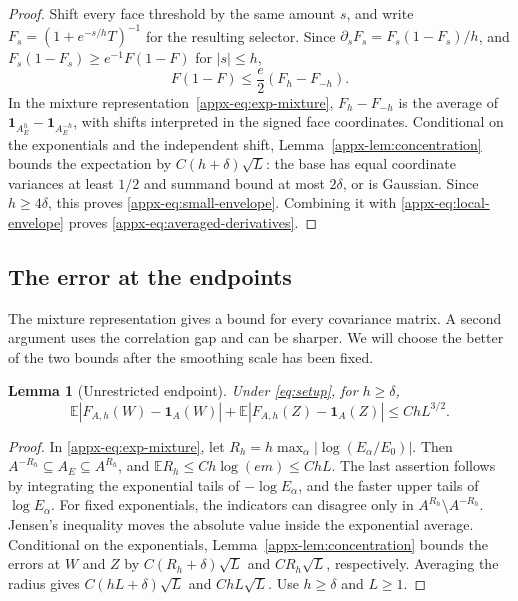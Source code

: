 \documentclass[11pt,letterpaper]{article}
\newtheorem{lemma}{Lemma}
\theoremstyle{remark}
\newcommand{\E}{\mathbb E}
\newcommand{\ind}{\mathbf 1}
\begin{document}
\begin{proof}
Shift every face threshold by the same amount \(s\), and write
\(F_s=(1+e^{-s/h}T)^{-1}\) for the resulting selector. Since
\(\partial_sF_s=F_s(1-F_s)/h\), and
\(F_s(1-F_s)\ge e^{-1}F(1-F)\) for \(|s|\le h\),
\[
 F(1-F)\le\frac e2(F_h-F_{-h}).
\]
In the mixture representation~\eqref{appx-eq:exp-mixture},
\(F_h-F_{-h}\) is the average of
\(\ind_{A_E^h}-\ind_{A_E^{-h}}\), with shifts interpreted in the
signed face coordinates. Conditional on the exponentials and the
independent shift, Lemma~\ref{appx-lem:concentration} bounds the expectation
by \(C(h+\delta)\sqrt L\): the base has equal coordinate variances
at least \(1/2\) and summand bound at most \(2\delta\), or is
Gaussian. Since \(h\ge4\delta\), this proves
\eqref{appx-eq:small-envelope}. Combining it with
\eqref{appx-eq:local-envelope} proves \eqref{appx-eq:averaged-derivatives}.
\end{proof}

\subsection{The error at the endpoints}

The mixture representation gives a bound for every covariance matrix.
A second argument uses the correlation gap and can be sharper.  We will
choose the better of the two bounds after the smoothing scale has been
fixed.

\begin{lemma}[Unrestricted endpoint]\label{appx-lem:endpoint-free}
Under \eqref{eq:setup}, for \(h\ge\delta\),
\begin{equation}
 \E|F_{A,h}(W)-\ind_A(W)|
 +\E|F_{A,h}(Z)-\ind_A(Z)|
 \le ChL^{3/2}.
 \label{appx-eq:endpoint-free}
\end{equation}
\end{lemma}

\begin{proof}
In \eqref{appx-eq:exp-mixture}, let
\(R_h=h\max_\alpha|\log(E_\alpha/E_0)|\).
Then \(A^{-R_h}\subseteq A_E\subseteq A^{R_h}\), and
\(\E R_h\le Ch\log(em)\le ChL\).
The last assertion follows by integrating the exponential tails of
\(-\log E_\alpha\), and the faster upper tails of \(\log E_\alpha\).
For fixed exponentials, the indicators can disagree only in
\(A^{R_h}\setminus A^{-R_h}\). Jensen's inequality moves the absolute
value inside the exponential average. Conditional on the exponentials,
Lemma~\ref{appx-lem:concentration} bounds the errors at \(W\) and \(Z\)
by \(C(R_h+\delta)\sqrt L\) and \(CR_h\sqrt L\), respectively.
Averaging the radius gives \(C(hL+\delta)\sqrt L\) and
\(ChL\sqrt L\).
Use \(h\ge\delta\) and \(L\ge1\).
\end{proof}
\end{document}
